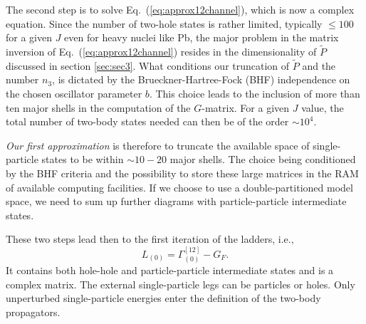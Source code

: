 The second step is to solve Eq.\ (\ref{eq:approx12channel}),
which is now a complex equation. 
Since the number of two-hole states is rather limited,
typically  $\le 100$
for a given $J$ even for heavy nuclei like Pb, the major
problem in the matrix inversion of Eq.\ (\ref{eq:approx12channel})
resides in the dimensionality of $\tilde{P}$ discussed in section
\ref{sec:sec3}. What conditions our truncation of $\tilde{P}$ 
and the number $n_3$, is dictated by the 
Brueckner-Hartree-Fock (BHF) independence on the chosen oscillator parameter
$b$. This choice leads to the inclusion of more than ten major shells
in the computation of the $G$-matrix.
For a given $J$ value, the total number of two-body states
needed can  then be of the order $ \sim 10^4$.

{\em Our first approximation} is therefore to truncate the available
space of single-particle states to be within $\sim 10-20$ major shells.
The choice being conditioned by the BHF criteria and the possibility
to store these large matrices in the RAM of available computing
facilities.  
If we choose to use a double-partitioned model space, we need 
to sum up further diagrams with particle-particle intermediate states.

These two steps lead then to the first iteration of
the ladders, i.e.,
\begin{equation}
     L_{(0)}=\Gamma^{[12]}_{(0)}-G_F.
\end{equation} 
It contains both hole-hole and particle-particle intermediate
states and is a complex matrix. The external single-particle
legs can be particles or holes. Only unperturbed single-particle 
energies enter the definition of the two-body propagators.

